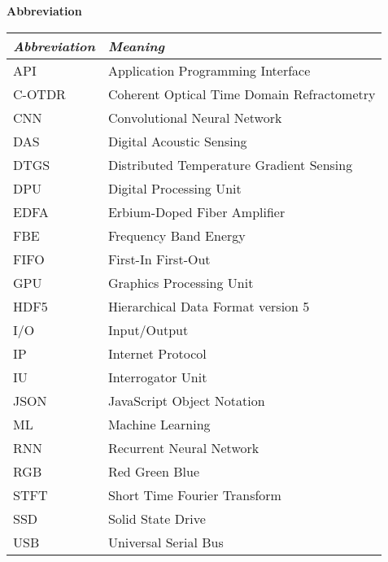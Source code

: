 

{\Large\textbf{Abbreviation}}

\vspace{0mm}
\setlength\LTleft{0pt}
\setlength\LTright{0pt}

\begin{longtable}{l @{\extracolsep\fill} p{}}
  \toprule
  {\itshape Abbreviation} & {\itshape Meaning}\\
  \midrule
  API    & Application Programming Interface\\
  C-OTDR & Coherent Optical Time Domain Refractometry\\
  CNN    & Convolutional Neural Network\\
  DAS    & Digital Acoustic Sensing\\
  DTGS   & Distributed Temperature Gradient Sensing\\
  DPU    & Digital Processing Unit\\
  EDFA   & Erbium-Doped Fiber Amplifier\\
  FBE    & Frequency Band Energy\\
  FIFO   & First-In First-Out\\
  GPU    & Graphics Processing Unit\\
  HDF5   & Hierarchical Data Format version 5\\
  I/O    & Input/Output\\
  IP     & Internet Protocol\\
  IU     & Interrogator Unit\\
  JSON   & JavaScript Object Notation\\
  ML     & Machine Learning\\
  RNN    & Recurrent Neural Network\\
  RGB    & Red Green Blue\\
  STFT   & Short Time Fourier Transform\\
  SSD    & Solid State Drive\\
  USB    & Universal Serial Bus\\
  \bottomrule
\end{longtable}


